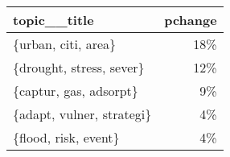 \begin{tabular}{p{2cm}r}
\toprule
              topic\_\_title &  pchange \\
\midrule
       \{urban, citi, area\} &      18\% \\
  \{drought, stress, sever\} &      12\% \\
    \{captur, gas, adsorpt\} &       9\% \\
 \{adapt, vulner, strategi\} &       4\% \\
      \{flood, risk, event\} &       4\% \\
\bottomrule
\end{tabular}
